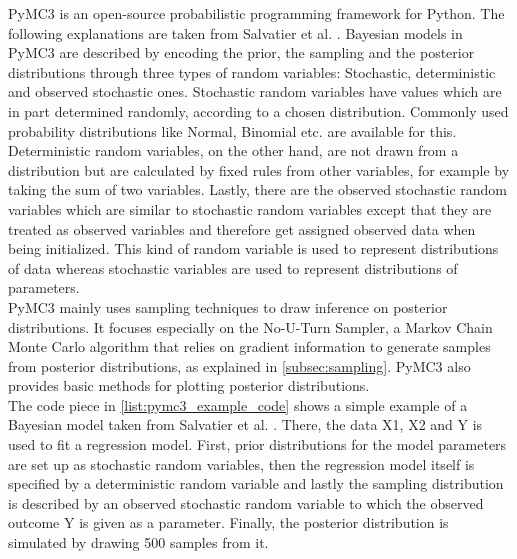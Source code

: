 \documentclass{article}
\begin{document}
PyMC3 is an open-source probabilistic programming framework for Python. The following explanations are taken from Salvatier et al. \cite{Salvatier2016}. Bayesian models in PyMC3 are described by encoding the prior, the sampling and the posterior distributions through three types of random variables: Stochastic, deterministic and observed stochastic ones. Stochastic random variables have values which are in part determined randomly, according to a chosen distribution. Commonly used probability distributions like Normal, Binomial etc. are available for this. Deterministic random variables, on the other hand, are not drawn from a distribution but are calculated by fixed rules from other variables, for example by taking the sum of two variables. Lastly, there are the observed stochastic random variables which are similar to stochastic random variables except that they are treated as observed variables and therefore get assigned observed data when being initialized. This kind of random variable is used to represent distributions of data whereas stochastic variables are used to represent distributions of parameters.
\\
PyMC3 mainly uses sampling techniques to draw inference on posterior distributions. It focuses especially on the No-U-Turn Sampler, a Markov Chain Monte Carlo algorithm that relies on gradient information to generate samples from posterior distributions, as explained in \autoref{subsec:sampling}. PyMC3 also provides basic methods for plotting posterior distributions.
\\
The code piece in \autoref{list:pymc3_example_code} shows a simple example of a Bayesian model taken from Salvatier et al. \cite{Salvatier2016}. There, the data X1, X2 and Y is used to fit a regression model. First, prior distributions for the model parameters are set up as stochastic random variables, then the regression model itself is specified by a deterministic random variable and lastly the sampling distribution is described by an observed stochastic random variable to which the observed outcome Y is given as a parameter. Finally, the posterior distribution is simulated by drawing 500 samples from it.
\end{document}
